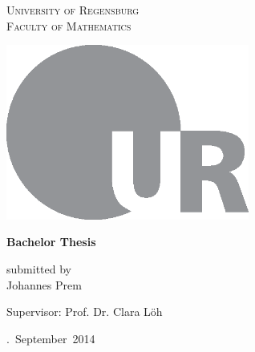 \begin{titlepage}
    \begin{center}
    \scshape
        University of Regensburg\\
        Faculty of Mathematics
        
    \vspace{2cm}
    
        
    \vspace{2.5cm}
    
        \includegraphics[width=0.6\textwidth]{ur_logo.eps}
        
    \vspace{2cm}
    
        {\Large\bfseries Bachelor Thesis}
        
    \vspace{1cm}
    
        submitted by\\
        Johannes Prem
        
    \vspace{1cm}
    
        Supervisor: Prof. Dr. Clara Löh
        
    \vfill
    
        \number\day.~September~2014
    \end{center}
\end{titlepage}

